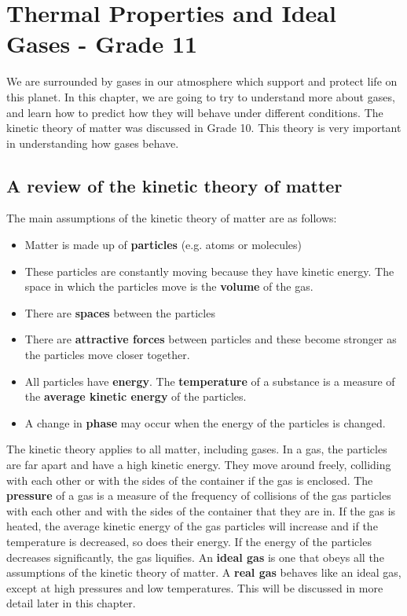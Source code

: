 






\chapter{Thermal Properties and Ideal Gases - Grade 11}
\label{chap:gases}

We are surrounded by gases in our atmosphere which support and protect life on this planet. In this chapter, we are going to try to understand more about gases, and learn how to predict how they will behave under different conditions. The kinetic theory of matter was discussed in Grade 10. This theory is very important in understanding how gases behave.



\section{A review of the kinetic theory of matter}
\label{sec:gases:kinetic theory} 

The main assumptions of the kinetic theory of matter are as follows:
\begin{itemize} 
  \item{Matter is made up of \textbf{particles} (e.g. atoms or molecules)}
\item{These particles are constantly moving because they have kinetic energy. The space in which the particles move is the \textbf{volume} of the gas.}
  \item{There are \textbf{spaces} between the particles}
  \item{There are \textbf{attractive forces} between particles and these become stronger as the particles move closer together.}
  \item{All particles have \textbf{energy}. The \textbf{temperature} of a substance is a measure of the \textbf{average kinetic energy} of the particles.}
  \item{A change in \textbf{phase} may occur when the energy of the particles is changed.}
\end{itemize}

The kinetic theory applies to all matter, including gases. In a gas, the particles are far apart and have a high kinetic energy. They move around freely, colliding with each other or with the sides of the container if the gas is enclosed. The \textbf{pressure} of a gas is a measure of the frequency of collisions of the gas particles with each other and with the sides of the container that they are in. If the gas is heated, the average kinetic energy of the gas particles will increase and if the temperature is decreased, so does their energy. If the energy of the particles decreases significantly, the gas liquifies. An \textbf{ideal gas} is one that obeys all the assumptions of the kinetic theory of matter. A \textbf{real gas} behaves like an ideal gas, except at high pressures and low temperatures. This will be discussed in more detail later in this chapter.

